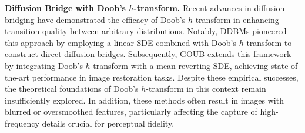 \textbf{Diffusion Bridge with Doob's $h$-transform.} Recent advances in diffusion bridging have demonstrated the efficacy of Doob's $h$-transform in enhancing transition quality between arbitrary distributions. Notably, DDBMs \cite{zhou2023denoisingdiffusionbridgemodels} pioneered this approach by employing a linear SDE combined with Doob's $h$-transform to construct direct diffusion bridges. Subsequently, GOUB \cite{yue2024imagerestorationgeneralizedornsteinuhlenbeck} extends this framework by integrating Doob's $h$-transform with a mean-reverting SDE, achieving state-of-the-art performance in image restoration tasks. Despite these empirical successes, the theoretical foundations of Doob's $h$-transform in this context remain insufficiently explored. In addition, these methods often result in images with blurred or oversmoothed features, particularly affecting the capture of high-frequency details crucial for perceptual fidelity. 


